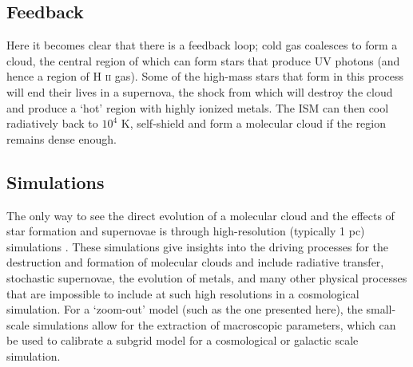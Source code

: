 \subsection{Feedback}

Here it becomes clear that there is a feedback loop; cold gas coalesces to form a cloud, the central region of which can form stars that produce UV photons (and hence a region of H \textsc{ii} gas).
Some of the high-mass stars that form in this process will end their lives in a supernova, the shock from which will destroy the cloud and produce a `hot' region with highly ionized metals.
The ISM can then cool radiatively back to $10^4$ K, self-shield and form a molecular cloud if the region remains dense enough.

\subsection{Simulations} 

The only way to see the direct evolution of a molecular cloud and the effects of star formation and supernovae is through high-resolution (typically 1 pc) simulations \citep{martizzi_supernova_2015, girichidis_silcc_2016}.
These simulations give insights into the driving processes for the destruction and formation of molecular clouds and include radiative transfer, stochastic supernovae, the evolution of metals, and many other physical processes that are impossible to include at such high resolutions in a cosmological simulation.
For a `zoom-out' model (such as the one presented here), the small-scale simulations allow for the extraction of macroscopic parameters, which can be used to calibrate a subgrid model for a cosmological or galactic scale simulation.

\begin{table}[hb]
    \centering
        \caption{Overview of the typical densities of the different phases of gas in the ISM, with $T$ the temperature and $\rho$ the gaseous gas density. Data adapted from \citet{ferriere_interstellar_2001} and \citet{mckee_stars_2015}.}
    \label{tab:ism}
\end{table}
